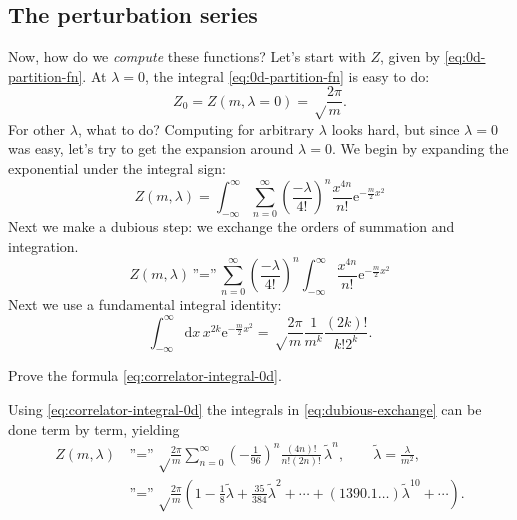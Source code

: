 \documentclass[12pt,letterpaper,reqno]{article}
\numberwithin{equation}{section}
\newcommand{\e}{{\mathrm e}}
\newcommand{\de}{\mathrm{d}}
\newcommand{\tlambda}{\widetilde\lambda}
\newcommand{\ti}[1]{\textit{#1}}
\begin{document}
\subsection{The perturbation series}

Now, how do we \ti{compute} these functions? Let's start with $Z$, given by \eqref{eq:0d-partition-fn}.
At $\lambda = 0$, the integral \eqref{eq:0d-partition-fn}
is easy to do:
\begin{equation} \label{eq:0d-Z0}
  Z_0 = Z(m, \lambda = 0) = \sqrt\frac{2\pi}{m}.
\end{equation}
For other $\lambda$, what to do? Computing for arbitrary $\lambda$ looks hard, but since $\lambda = 0$ was
easy, let's try to get the expansion around $\lambda = 0$. 
We begin by expanding the exponential under the integral sign:
\begin{equation}
  Z(m, \lambda) = \int_{-\infty}^\infty \sum_{n=0}^\infty \left( \frac{-\lambda}{4!} \right)^n \frac{x^{4n}}{n!} \e^{-\frac{m}{2} x^2}
\end{equation}
Next we make a dubious step: we exchange the orders of summation and integration.
\begin{equation} \label{eq:dubious-exchange}
  Z(m, \lambda) \, \text{''=''} \, \sum_{n=0}^\infty \left( \frac{-\lambda}{4!} \right)^n \int_{-\infty}^\infty \frac{x^{4n}}{n!} \e^{-\frac{m}{2} x^2}
\end{equation}
Next we use a fundamental integral identity:
\begin{equation} \label{eq:correlator-integral-0d}
  \int_{-\infty}^\infty \de x\,x^{2k} \e^{-\frac{m}{2}x^2}  = \sqrt\frac{2\pi}{m} \frac{1}{m^k} \frac{(2k)!}{k!2^k}.
\end{equation}
\begin{exercise} Prove the formula \eqref{eq:correlator-integral-0d}.
\end{exercise}
Using \eqref{eq:correlator-integral-0d} the integrals in \eqref{eq:dubious-exchange} can be done term by term, yielding
\begin{align} \label{eq:0d-perturbation-series}
  Z(m, \lambda) \, &\text{''=''} \, \sqrt\frac{2\pi}{m} \sum_{n=0}^\infty \left( - \frac{1}{96} \right)^n \frac{(4n)!}{n!(2n)!} \, \tlambda^n, \qquad \tlambda = \frac{\lambda}{m^2}, \\
  &\text{''=''} \, \sqrt\frac{2\pi}{m} \left(1 - \frac18 \tlambda + \frac{35}{384} \tlambda^2 + \cdots + (1390.1 \dots) \tlambda^{10} + \cdots \right).
\end{align}
\end{document}
